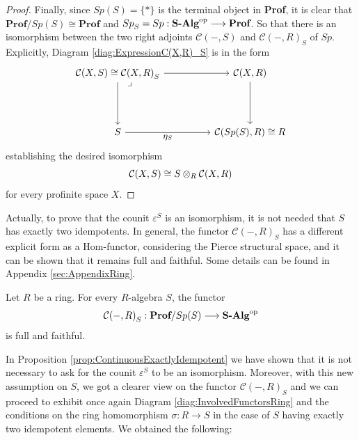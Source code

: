 \begin{proposition}
\begin{proof}
        Finally, since $Sp(S) = \{*\}$ is the terminal object in \textbf{Prof}, it is clear that $\textbf{Prof}/Sp(S)\cong\textbf{Prof}$ and ${Sp}_S=Sp:{\textbf{S-Alg}}^{\mathrm{op}}\longrightarrow\textbf{Prof}$. So that there is an isomorphism between the two right adjoints $\mathcal{C}(-,S)$ and ${\mathcal{C}(-,R)}_S$ of $Sp$. Explicitly, Diagram \ref{diag:ExpressionC(X,R)_S} is in the form
        \begin{equation*}
            \begin{tikzcd}[every label/.append style = {font = \small}]
                \pullback \mathcal{C}(X,S) \cong {\mathcal{C}(X,R)}_S \arrow[rr] \arrow[dd] & & \mathcal{C}(X,R) \arrow[dd] \\ \\ S \arrow[rr, "\eta_S"'] & & \mathcal{C}(Sp(S),R)\cong R
            \end{tikzcd}
        \end{equation*}
        establishing the desired isomorphism
        \[ \mathcal{C}(X,S)\cong S\otimes_{R}\mathcal{C}(X,R) \]
        for every profinite space $X$.
    \end{proof}
\end{proposition}

Actually, to prove that the counit $\varepsilon^S$ is an isomorphism, it is not needed that $S$ has exactly two idempotents. In general, the functor ${\mathcal{C}(-,R)}_S$ has a different explicit form as a $\text{Hom}$-functor, considering the Pierce structural space, and it can be shown that it remains full and faithful. Some details can be found in Appendix \ref{sec:AppendixRing}.
\begin{proposition}
\label{prop:InducedFullFaithfulRingGeneral}
    Let $R$ be a ring. For every $R$-algebra $S$, the functor
    \[ {\mathcal{C}(-,R)}_S:\textbf{Prof}/Sp(S)\longrightarrow{\textbf{S-Alg}}^{\mathrm{op}} \]
    is full and faithful.
\end{proposition}

In Proposition \ref{prop:ContinuousExactlyIdempotent} we have shown that it is not necessary to ask for the counit $\varepsilon^S$ to be an isomorphism. Moreover, with this new assumption on $S$, we got a clearer view on the functor ${\mathcal{C}(-,R)}_S$ and we can proceed to exhibit once again Diagram \ref{diag:InvolvedFunctorsRing} and the conditions on the ring homomorphism $\sigma:R\to S$ in the case of $S$ having exactly two idempotent elements. We obtained the following:


